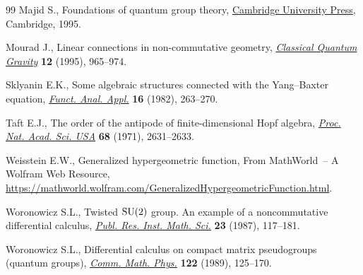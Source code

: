 \documentclass[10pt,a4paper]{amsart}
\numberwithin{equation}{section}
\newcommand{\<}{\langle}
\renewcommand{\>}{\rangle}
\begin{document}
\begin{thebibliography}{99}
Majid S., Foundations of quantum group theory, \href{https://doi.org/10.1017/CBO9780511613104}{Cambridge University Press},
 Cambridge, 1995.

Mourad J., Linear connections in non-commutative geometry, \href{https://doi.org/10.1088/0264-9381/12/4/007}{\textit{Classical
 Quantum Gravity}} \textbf{12} (1995), 965--974.

Sklyanin E.K., Some algebraic structures connected with the {Y}ang--{B}axter
 equation, \href{https://doi.org/10.1007/BF01077848}{\textit{Funct. Anal. Appl.}} \textbf{16} (1982), 263--270.

Taft E.J., The order of the antipode of finite-dimensional {H}opf algebra,
 \href{https://doi.org/10.1073/pnas.68.11.2631}{\textit{Proc. Nat. Acad. Sci. USA}} \textbf{68} (1971), 2631--2633.

Weisstein E.W., Generalized hypergeometric function, {F}rom MathWorld~-- A
 Wolfram Web Resource,
 \url{https://mathworld.wolfram.com/GeneralizedHypergeometricFunction.html}.

Woronowicz S.L., Twisted {${\rm SU}(2)$} group. {A}n example of a
 noncommutative differential calculus, \href{https://doi.org/10.2977/prims/1195176848}{\textit{Publ. Res. Inst. Math. Sci.}}
 \textbf{23} (1987), 117--181.

Woronowicz S.L., Differential calculus on compact matrix pseudogroups (quantum
 groups), \href{https://doi.org/10.1007/BF01221411}{\textit{Comm. Math. Phys.}} \textbf{122} (1989), 125--170.

\end{thebibliography}
\end{document}
